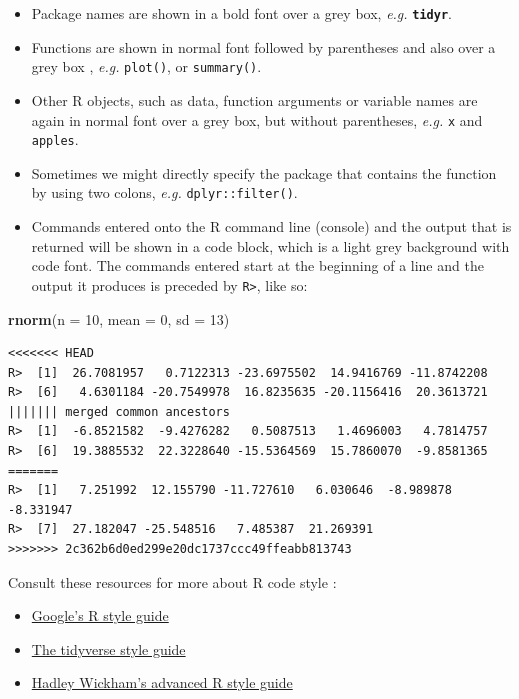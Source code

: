 \documentclass[]{book}
\newenvironment{Shaded}{\begin{snugshade}}{\end{snugshade}}
\newcommand{\KeywordTok}[1]{\textcolor[rgb]{0.13,0.29,0.53}{\textbf{#1}}}
\newcommand{\DataTypeTok}[1]{\textcolor[rgb]{0.13,0.29,0.53}{#1}}
\newcommand{\DecValTok}[1]{\textcolor[rgb]{0.00,0.00,0.81}{#1}}
\newcommand{\NormalTok}[1]{#1}
\providecommand{\tightlist}{%
  \setlength{\itemsep}{0pt}\setlength{\parskip}{0pt}}
\theoremstyle{definition}
\theoremstyle{definition}
\theoremstyle{definition}
\theoremstyle{remark}
\begin{document}
\begin{itemize}
\tightlist
\item
  Package names are shown in a bold font over a grey box, \emph{e.g.}
  \textbf{\texttt{tidyr}}.
\item
  Functions are shown in normal font followed by parentheses and also
  over a grey box , \emph{e.g.} \texttt{plot()}, or \texttt{summary()}.
\item
  Other R objects, such as data, function arguments or variable names
  are again in normal font over a grey box, but without parentheses,
  \emph{e.g.} \texttt{x} and \texttt{apples}.
\item
  Sometimes we might directly specify the package that contains the
  function by using two colons, \emph{e.g.} \texttt{dplyr::filter()}.
\item
  Commands entered onto the R command line (console) and the output that
  is returned will be shown in a code block, which is a light grey
  background with code font. The commands entered start at the beginning
  of a line and the output it produces is preceded by
  \texttt{R\textgreater{}}, like so:
\end{itemize}

\begin{Shaded}
\begin{Highlighting}[]
\KeywordTok{rnorm}\NormalTok{(}\DataTypeTok{n =} \DecValTok{10}\NormalTok{, }\DataTypeTok{mean =} \DecValTok{0}\NormalTok{, }\DataTypeTok{sd =} \DecValTok{13}\NormalTok{)}
\end{Highlighting}
\end{Shaded}

\begin{verbatim}
<<<<<<< HEAD
R>  [1]  26.7081957   0.7122313 -23.6975502  14.9416769 -11.8742208
R>  [6]   4.6301184 -20.7549978  16.8235635 -20.1156416  20.3613721
||||||| merged common ancestors
R>  [1]  -6.8521582  -9.4276282   0.5087513   1.4696003   4.7814757
R>  [6]  19.3885532  22.3228640 -15.5364569  15.7860070  -9.8581365
=======
R>  [1]   7.251992  12.155790 -11.727610   6.030646  -8.989878  -8.331947
R>  [7]  27.182047 -25.548516   7.485387  21.269391
>>>>>>> 2c362b6d0ed299e20dc1737ccc49ffeabb813743
\end{verbatim}

Consult these resources for more about R code style :

\begin{itemize}
\tightlist
\item
  \href{https://google.github.io/styleguide/Rguide.xml}{Google's R style
  guide}
\item
  \href{http://style.tidyverse.org}{The tidyverse style guide}
\item
  \href{http://adv-r.had.co.nz/Style.html}{Hadley Wickham's advanced R
  style guide}
\end{itemize}
\end{document}
